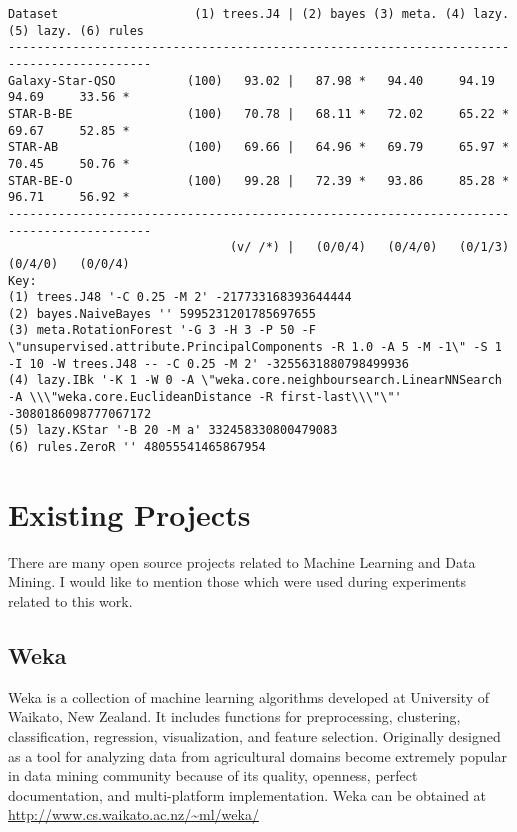 \clearpage


\begin{lstlisting}
Dataset                   (1) trees.J4 | (2) bayes (3) meta. (4) lazy. (5) lazy. (6) rules
------------------------------------------------------------------------------------------
Galaxy-Star-QSO          (100)   93.02 |   87.98 *   94.40     94.19     94.69     33.56 *
STAR-B-BE                (100)   70.78 |   68.11 *   72.02     65.22 *   69.67     52.85 *
STAR-AB                  (100)   69.66 |   64.96 *   69.79     65.97 *   70.45     50.76 *
STAR-BE-O                (100)   99.28 |   72.39 *   93.86     85.28 *   96.71     56.92 *
------------------------------------------------------------------------------------------
                               (v/ /*) |   (0/0/4)   (0/4/0)   (0/1/3)   (0/4/0)   (0/0/4)
Key:
(1) trees.J48 '-C 0.25 -M 2' -217733168393644444
(2) bayes.NaiveBayes '' 5995231201785697655
(3) meta.RotationForest '-G 3 -H 3 -P 50 -F \"unsupervised.attribute.PrincipalComponents -R 1.0 -A 5 -M -1\" -S 1 -I 10 -W trees.J48 -- -C 0.25 -M 2' -3255631880798499936
(4) lazy.IBk '-K 1 -W 0 -A \"weka.core.neighboursearch.LinearNNSearch -A \\\"weka.core.EuclideanDistance -R first-last\\\"\"' -3080186098777067172
(5) lazy.KStar '-B 20 -M a' 332458330800479083
(6) rules.ZeroR '' 48055541465867954
\end{lstlisting}


\section{Existing Projects}
There are many open source projects related to Machine Learning and
Data Mining. I would like to mention those which were used during
experiments related to this work.

\subsection{Weka}

Weka is a collection of machine learning algorithms developed at
University of Waikato, New Zealand. It includes functions for
preprocessing, clustering, classification, regression, visualization,
and feature selection. Originally designed as a tool for analyzing
data from agricultural domains become extremely popular in data mining
community because of its quality, openness, perfect documentation, and
multi-platform implementation. Weka can be obtained at
\url{http://www.cs.waikato.ac.nz/~ml/weka/}



